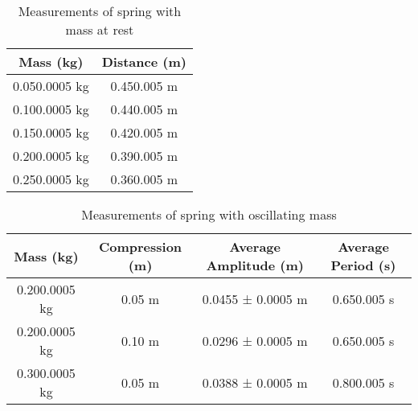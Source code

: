 

{}

\begin{table}[H]
    \centering
    \begin{tabular}{|c|c|}
    \hline
    \hline
        Mass (kg) & Distance (m) \\
        \hline
        0.050.0005 kg & 0.450.005 m \\
        \hline
        0.100.0005 kg & 0.440.005 m \\
        \hline
        0.150.0005 kg & 0.420.005 m \\
        \hline
        0.200.0005 kg & 0.390.005 m \\
        \hline
        0.250.0005 kg & 0.360.005 m \\
		\hline        
        \hline
    \end{tabular}
    \caption{Measurements of spring with mass at rest}
    \label{exp1}
\end{table}

\begin{table}[H]
    \centering
    \begin{tabular}{|c|c|c|c|}
    \hline
        Mass (kg) & Compression (m) & Average Amplitude (m) & Average Period (s) \\
		\hline        
        \hline
        0.200.0005 kg & 0.05 m & 0.0455 ± 0.0005 m & 0.650.005 s \\
        \hline
        0.200.0005 kg & 0.10 m & 0.0296 ± 0.0005 m & 0.650.005 s \\
        \hline
        0.300.0005 kg & 0.05 m  & 0.0388 ± 0.0005 m & 0.800.005 s \\
        \hline
        \hline
    \end{tabular}
    \caption{Measurements of spring with oscillating mass}
    \label{exp2}
\end{table}




